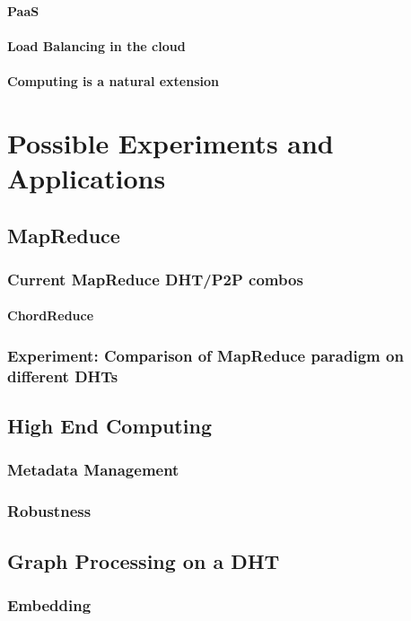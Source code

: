 \documentclass[10pt,letterpaper]{report}
\begin{document}
\subsubsection{PaaS}
\subsubsection{Load Balancing in the cloud}
\subsubsection{Computing is a natural extension}

\chapter{Possible Experiments and Applications}


\section{MapReduce}
\subsection{Current MapReduce DHT/P2P combos}
\subsubsection{ChordReduce}
\subsection{Experiment: Comparison of MapReduce paradigm on different DHTs}


\section{High End Computing}
\subsection{Metadata Management}
\subsection{Robustness}

\section{Graph Processing on a DHT}
\subsection{Embedding}
\end{document}
